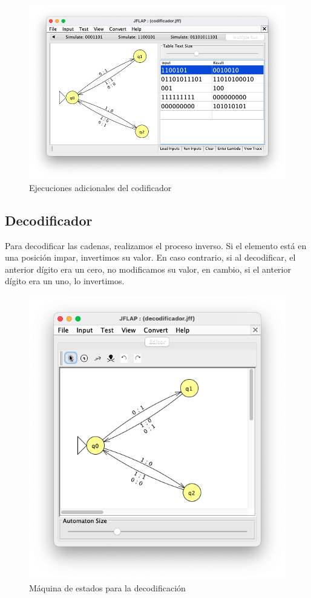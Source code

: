 \begin{figure}[H] 
	\centering
	\includegraphics[scale=0.4]{../practica_3/images/adicionales_codificador.png} 
	\caption{Ejecuciones adicionales del codificador} 
    \label{fig:adicionales_codificador}
\end{figure}

\subsection{Decodificador}

Para decodificar las cadenas, realizamos el proceso inverso. Si el elemento está en una posición impar, invertimos su valor. En caso contrario, si al decodificar, el anterior dígito era un cero, no modificamos su valor,
en cambio, si el anterior dígito era un uno, lo invertimos. 

\begin{figure}[H] 
	\centering
	\includegraphics[scale=0.45]{../practica_3/images/decodificador.png} 
	\caption{Máquina de estados para la decodificación} 
    \label{fig:decodificador}
\end{figure}


